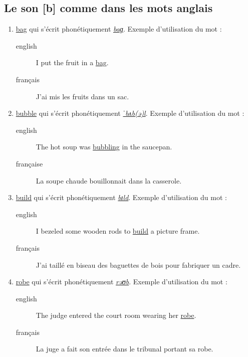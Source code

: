 \subsection{Le son [b] comme dans les mots anglais}
\label{sec:orgab621dc}
\begin{enumerate}
\item \href{http://www.wordreference.com/enfr/bag}{bag} qui s'écrit phonétiquement \href{https://en.oxforddictionaries.com/definition/bag}{\emph{baɡ}}. Exemple d'utilisation du mot :
\begin{description}
\item[{english}] \textenglish{I put the fruit in a \href{https://youtu.be/DLQhGy7BIjQ}{bag}.}
\item[{français}] J'ai mis les fruits dans un sac.
\end{description}
\item \href{http://www.wordreference.com/enfr/bubble}{bubble} qui s'écrit phonétiquement \href{https://en.oxforddictionaries.com/definition/bubble}{\emph{ˈbʌb(ə)l}}. Exemple d'utilisation du mot :
\begin{description}
\item[{english}] \textenglish{The hot soup was \href{https://youtu.be/h6OhzwkBAEc}{bubbling} in the saucepan.}
\item[{française}] La soupe chaude bouillonnait dans la casserole.
\end{description}
\item \href{http://www.wordreference.com/enfr/build}{build} qui s'écrit phonétiquement \href{https://en.oxforddictionaries.com/definition/build}{\emph{bɪld}}. Exemple d'utilisation du mot :
\begin{description}
\item[{english}] \textenglish{I bezeled some wooden rods to \href{https://youtu.be/UC4eCvuxjIU}{build} a picture frame.}
\item[{français}] J'ai taillé en biseau des baguettes de bois pour fabriquer un cadre.
\end{description}
\item \href{http://www.wordreference.com/enfr/robe}{robe} qui s'écrit phonétiquement \href{https://en.oxforddictionaries.com/definition/robe}{\emph{rəʊb}}. Exemple d'utilisation du mot :
\begin{description}
\item[{english}] \textenglish{The judge entered the court room wearing her \href{https://youtu.be/eiObDiqVcPk}{robe}.}
\item[{français}] La juge a fait son entrée dans le tribunal portant sa
robe.
\end{description}
\end{enumerate}
